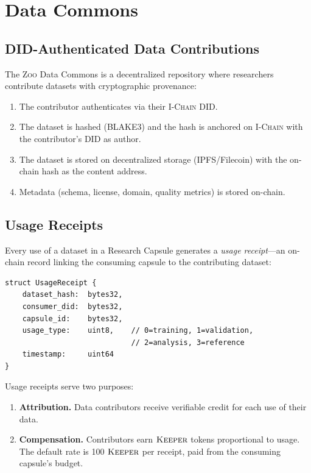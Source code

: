 \documentclass[11pt,letterpaper]{article}
\theoremstyle{definition}
\theoremstyle{remark}
\newcommand{\Zoo}{\textsc{Zoo}}
\newcommand{\IChain}{\textsc{I-Chain}}
\newcommand{\KEEPER}{\textsc{Keeper}}
\newcommand{\DID}{\textsc{DID}}
\begin{document}
\section{Data Commons}
\label{sec:commons}

\subsection{DID-Authenticated Data Contributions}

The \Zoo{} Data Commons \cite{zoo-data-commons} is a decentralized repository where researchers contribute datasets with cryptographic provenance:

\begin{enumerate}
    \item The contributor authenticates via their \IChain{} \DID{}.
    \item The dataset is hashed (BLAKE3) and the hash is anchored on \IChain{} with the contributor's \DID{} as author.
    \item The dataset is stored on decentralized storage (IPFS/Filecoin) with the on-chain hash as the content address.
    \item Metadata (schema, license, domain, quality metrics) is stored on-chain.
\end{enumerate}

\subsection{Usage Receipts}

Every use of a dataset in a Research Capsule generates a \emph{usage receipt}---an on-chain record linking the consuming capsule to the contributing dataset:

\begin{verbatim}
struct UsageReceipt {
    dataset_hash:  bytes32,
    consumer_did:  bytes32,
    capsule_id:    bytes32,
    usage_type:    uint8,    // 0=training, 1=validation,
                             // 2=analysis, 3=reference
    timestamp:     uint64
}
\end{verbatim}

Usage receipts serve two purposes:
\begin{enumerate}
    \item \textbf{Attribution.} Data contributors receive verifiable credit for each use of their data.
    \item \textbf{Compensation.} Contributors earn $\KEEPER$ tokens proportional to usage. The default rate is 100 $\KEEPER$ per receipt, paid from the consuming capsule's budget.
\end{enumerate}
\end{document}
